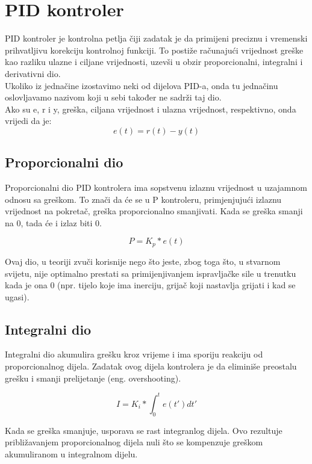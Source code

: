 \documentclass[../Document.tex]{subfiles}
\begin{document}
\section{PID kontroler} \label{pid}
PID kontroler je kontrolna petlja čiji zadatak je da primijeni preciznu i vremenski prihvatljivu korekciju kontrolnoj funkciji. To postiže računajući vrijednost greške kao razliku ulazne i ciljane vrijednosti, uzevši u obzir proporcionalni, integralni i derivativni dio.\\

\noindent Ukoliko iz jednačine izostavimo neki od dijelova PID-a, onda tu jednačinu oslovljavamo nazivom koji u sebi također ne sadrži taj dio.
\\

\noindent Ako su e, r i y, greška, ciljana vrijednost i ulazna vrijednost, respektivno, onda vrijedi da je:
$$
    e(t) = r(t) - y(t)
$$
\subsection{Proporcionalni dio}
Proporcionalni dio PID kontrolera ima sopstvenu izlaznu vrijednost u uzajamnom odnosu sa greškom. To znači da će se u P kontroleru, primjenjujući izlaznu vrijednost na pokretač, greška proporcionalno smanjivati. Kada se greška smanji na 0, tada će i izlaz biti 0.

$$
    P=K_p*e(t)
$$

\noindent Ovaj dio, u teoriji zvuči korisnije nego što jeste, zbog toga što, u stvarnom svijetu, nije optimalno prestati sa primijenjivanjem ispravljačke sile u trenutku kada je ona 0 (npr. tijelo koje ima inerciju, grijač koji nastavlja grijati i kad se ugasi).


\subsection{Integralni dio}
Integralni dio akumulira grešku kroz vrijeme i ima sporiju reakciju od proporcionalnog dijela. Zadatak ovog dijela kontrolera je da eliminiše preostalu grešku i smanji prelijetanje (eng. overshooting).

$$
    I=K_i*\int_{0}^{t}e(t')dt'
$$

\noindent Kada se greška smanjuje, usporava se rast integranlog dijela. Ovo rezultuje približavanjem proporcionalnog dijela nuli što se kompenzuje greškom akumuliranom u integralnom dijelu.

\end{document}
